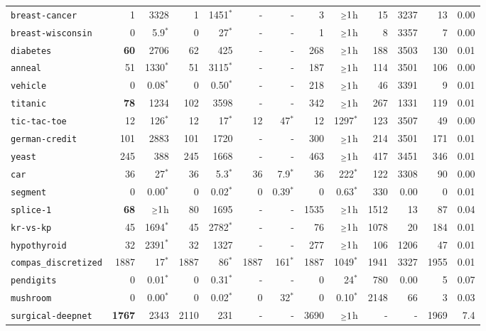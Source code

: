 \begin{tabular}{lrrrrrrrrrrrr}
\texttt{breast-cancer} & 1 & 3328 & 1 & 1451$^*$ & - & - & 3 & $\mathsmaller{\geq}1$h & 15 & 3237 & 13 & 0.00\\
\texttt{breast-wisconsin} & 0 & 5.9$^*$ & 0 & 27$^*$ & - & - & 1 & $\mathsmaller{\geq}1$h & 8 & 3357 & 7 & 0.00\\
\texttt{diabetes} & \textbf{60} & 2706 & 62 & 425 & - & - & 268 & $\mathsmaller{\geq}1$h & 188 & 3503 & 130 & 0.01\\
\texttt{anneal} & 51 & 1330$^*$ & 51 & 3115$^*$ & - & - & 187 & $\mathsmaller{\geq}1$h & 114 & 3501 & 106 & 0.00\\
\texttt{vehicle} & 0 & 0.08$^*$ & 0 & 0.50$^*$ & - & - & 218 & $\mathsmaller{\geq}1$h & 46 & 3391 & 9 & 0.01\\
\texttt{titanic} & \textbf{78} & 1234 & 102 & 3598 & - & - & 342 & $\mathsmaller{\geq}1$h & 267 & 1331 & 119 & 0.01\\
\texttt{tic-tac-toe} & 12 & 126$^*$ & 12 & 17$^*$ & 12 & 47$^*$ & 12 & 1297$^*$ & 123 & 3507 & 49 & 0.00\\
\texttt{german-credit} & 101 & 2883 & 101 & 1720 & - & - & 300 & $\mathsmaller{\geq}1$h & 214 & 3501 & 171 & 0.01\\
\texttt{yeast} & 245 & 388 & 245 & 1668 & - & - & 463 & $\mathsmaller{\geq}1$h & 417 & 3451 & 346 & 0.01\\
\texttt{car} & 36 & 27$^*$ & 36 & 5.3$^*$ & 36 & 7.9$^*$ & 36 & 222$^*$ & 122 & 3308 & 90 & 0.00\\
\texttt{segment} & 0 & 0.00$^*$ & 0 & 0.02$^*$ & 0 & 0.39$^*$ & 0 & 0.63$^*$ & 330 & 0.00 & 0 & 0.01\\
\texttt{splice-1} & \textbf{68} & $\mathsmaller{\geq}1$h & 80 & 1695 & - & - & 1535 & $\mathsmaller{\geq}1$h & 1512 & 13 & 87 & 0.04\\
\texttt{kr-vs-kp} & 45 & 1694$^*$ & 45 & 2782$^*$ & - & - & 76 & $\mathsmaller{\geq}1$h & 1078 & 20 & 184 & 0.01\\
\texttt{hypothyroid} & 32 & 2391$^*$ & 32 & 1327 & - & - & 277 & $\mathsmaller{\geq}1$h & 106 & 1206 & 47 & 0.01\\
\texttt{compas\_discretized} & 1887 & 17$^*$ & 1887 & 86$^*$ & 1887 & 161$^*$ & 1887 & 1049$^*$ & 1941 & 3327 & 1955 & 0.01\\
\texttt{pendigits} & 0 & 0.01$^*$ & 0 & 0.31$^*$ & - & - & 0 & 24$^*$ & 780 & 0.00 & 5 & 0.07\\
\texttt{mushroom} & 0 & 0.00$^*$ & 0 & 0.02$^*$ & 0 & 32$^*$ & 0 & 0.10$^*$ & 2148 & 66 & 3 & 0.03\\
\texttt{surgical-deepnet} & \textbf{1767} & 2343 & 2110 & 231 & - & - & 3690 & $\mathsmaller{\geq}1$h & - & - & 1969 & 7.4\\

\end{tabular}
